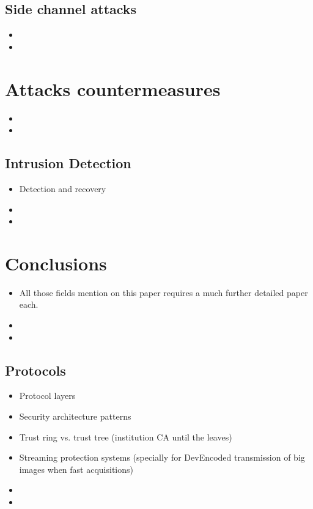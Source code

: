 \documentclass[10pt,a4paper,twoside]{llncs}
\begin{document}
%
\subsection{Side channel attacks \label{sec:sideChannelAttacks}}

\begin{itemize}
 \item
 \item 
\end{itemize}

%
\section{Attacks countermeasures \label{sec:countermeasures}}

\begin{itemize}
 \item
 \item 
\end{itemize}

%
\subsection{Intrusion Detection \label{sec:intrusionDetection}}

\begin{itemize}
 \item Detection and recovery
 \item 
 \item 
\end{itemize}

%
\section{Conclusions \label{sec:conclusions}}

\begin{itemize}
 \item All those fields mention on this paper requires a much further detailed paper each.
 \item 
 \item
\end{itemize}

%
\subsection{Protocols \label{sec:protocols}}

\begin{itemize}
 \item Protocol layers \cite{Schneier:1995:ACP:572932}
 \item Security architecture patterns
 \item Trust ring vs. trust tree (institution CA until the leaves)
 \item Streaming protection systems (specially for DevEncoded transmission of big images when fast acquisitions)
 \item 
 \item 
\end{itemize}
\end{document}
